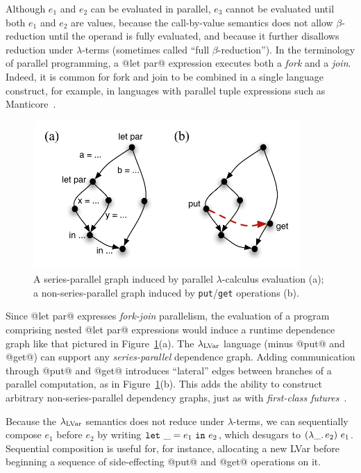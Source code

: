 Although $e_1$ and $e_2$ can be evaluated in parallel, $e_3$ cannot be
evaluated until both $e_1$ and $e_2$ are values, because the
call-by-value semantics does not allow $\beta$-reduction until the
operand is fully evaluated, and because it further disallows reduction
under $\lambda$-terms (sometimes called ``full $\beta$-reduction'').
In the terminology of parallel programming, a @let par@ expression
executes both a \emph{fork} and a \emph{join}.  Indeed, it is common
for fork and join to be combined in a single language construct, for
example, in languages with parallel tuple expressions such as
Manticore~\cite{manticore_parallel_tuples}.

\begin{figure}[tb]
  \centering 
\includegraphics[width=4in]{chapter2/figures/lvars-series-parallel.pdf} 
\caption{A series-parallel graph induced by parallel
  $\lambda$-calculus evaluation (a); a non-series-parallel graph
  induced by \lstinline|put|/\lstinline|get| operations (b).}
  \label{f:lvars-series-parallel}
\end{figure}

Since @let par@ expresses \emph{fork-join} parallelism, the evaluation
of a program comprising nested @let par@ expressions would induce a
runtime dependence graph like that pictured in
Figure~\ref{f:lvars-series-parallel}(a).  The $\lambda_{\textrm{LVar}}$ language
(minus @put@ and @get@) can support any \emph{series-parallel}
dependence graph.  Adding communication through @put@ and @get@
introduces ``lateral'' edges between branches of a parallel
computation, as in Figure~\ref{f:lvars-series-parallel}(b).  This adds
the ability to construct arbitrary non-series-parallel dependency
graphs, just as with \emph{first-class
  futures}~\cite{beyond-nested-workstealing}.

Because the $\lambda_{\textrm{LVar}}$ semantics does not reduce under
$\lambda$-terms, we can sequentially compose $e_1$ before $e_2$ by
writing $\mbox{\texttt{let}}~\_=e_1~\mbox{\texttt{in}}~e_2$, which desugars to
$(\lambda\_.\,e_2)~e_1$.  Sequential composition is useful for,
for instance, allocating a new LVar before beginning a sequence of
side-effecting @put@ and @get@ operations on it.
